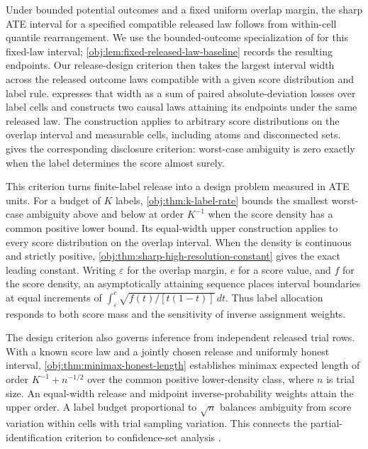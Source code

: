 \documentclass[11pt]{article}
\begin{document}
Under bounded potential outcomes and a fixed uniform overlap margin, the sharp ATE interval for a specified compatible released law follows from within-cell quantile rearrangement. We use the bounded-outcome specialization of \citet[Theorem 3.2 and eq. (3.1)]{FanShermanShum2014} for this fixed-law interval; \cref{obj:lem:fixed-released-law-baseline} records the resulting endpoints. Our release-design criterion then takes the largest interval width across the released outcome laws compatible with a given score distribution and label rule.  expresses that width as a sum of paired absolute-deviation losses over label cells and constructs two causal laws attaining its endpoints under the same released law. The construction applies to arbitrary score distributions on the overlap interval and measurable cells, including atoms and disconnected sets.  gives the corresponding disclosure criterion: worst-case ambiguity is zero exactly when the label determines the score almost surely.

This criterion turns finite-label release into a design problem measured in ATE units. For a budget of \(K\) labels, \cref{obj:thm:k-label-rate} bounds the smallest worst-case ambiguity above and below at order \(K^{-1}\) when the score density has a common positive lower bound. Its equal-width upper construction applies to every score distribution on the overlap interval. When the density is continuous and strictly positive, \cref{obj:thm:sharp-high-resolution-constant} gives the exact leading constant. Writing \(\varepsilon\) for the overlap margin, \(e\) for a score value, and \(f\) for the score density, an asymptotically attaining sequence places interval boundaries at equal increments of \(\int_\varepsilon^e \sqrt{f(t)/[t(1-t)]}\,dt\). Thus label allocation responds to both score mass and the sensitivity of inverse assignment weights.

The design criterion also governs inference from independent released trial rows. With a known score law and a jointly chosen release and uniformly honest interval, \cref{obj:thm:minimax-honest-length} establishes minimax expected length of order \(K^{-1}+n^{-1/2}\) over the common positive lower-density class, where \(n\) is trial size. An equal-width release and midpoint inverse-probability weights attain the upper order. A label budget proportional to \(\sqrt n\) balances ambiguity from score variation within cells with trial sampling variation. This connects the partial-identification criterion to confidence-set analysis \citep{ImbensManski2004,Stoye2009,ChernozhukovHongTamer2007,KaidoMolinariStoye2019}.
\end{document}
